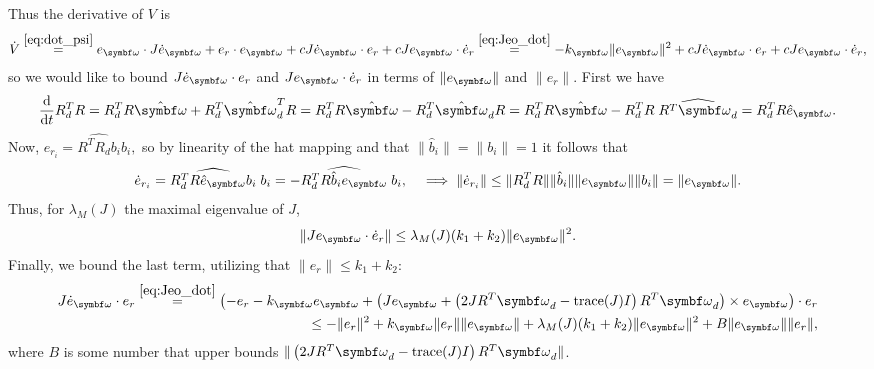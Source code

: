 Thus the derivative of $V$ is
\begin{equation}
  \begin{aligned}
    \dot V \overset{\eqref{eq:dot_psi}}= e_\bomega \cdot J \dot e_\bomega + e_r \cdot e_\bomega + c J \dot e_\bomega \cdot e_r + c J e_\bomega \cdot \dot e_r
    \overset{\eqref{eq:Jeo_dot}}= -k_\bomega \| e_\bomega \|^2 + c J \dot e_\bomega \cdot e_r + c J e_\bomega \cdot \dot e_r,
  \end{aligned}
\end{equation}
so we would like to bound $J \dot e_\bomega \cdot e_r$ and $J e_\bomega \cdot \dot e_r$ in terms of $\| e_\bomega \|$ and $\| e_r \|$.  First we have
\begin{equation}
  \label{eq:rdr_dt}
  \frac{\mathrm{d}}{\mathrm{d}t} R_d^T R = R_d^T R \hat \bomega + R_d^T \hat \bomega_d^T R  = R_d^T R \hat \bomega - R_d^T \hat \bomega_d R = R_d^T R \hat \bomega - R_d^T R \; \widehat{R^T \bomega_d} = R_d^T R \hat e_\bomega.
\end{equation}
Now, $e_{r_i} = \widehat{R^T R_d b_i} b_i,$ so by linearity of the hat mapping and that $\| \hat b_i \| = \| b_i \| = 1$ it follows that
\begin{equation}
  \dot e_{r_i} = \widehat{R_d^T R \hat e_\bomega b_i} \; b_i = - \widehat{R_d^T R \hat b_i e_\bomega} \; b_i, \quad \implies \| \dot e_{r_i} \| \leq \| R_d^T R \| \| \hat b_i \| \| e_\bomega \| \| b_i \| = \| e_\bomega \|.
\end{equation}
Thus, for $\lambda_M(J)$ the maximal eigenvalue of $J$,
\begin{equation}
  \| J e_\bomega \cdot \dot e_r \| \leq \lambda_M(J) (k_1 + k_2) \| e_\bomega \|^2.
\end{equation}
Finally, we bound the last term, utilizing that $\| e_r \| \leq k_1 + k_2$:
\begin{equation}
  \begin{aligned}
    J \dot e_\bomega \cdot  e_r  \overset{\eqref{eq:Jeo_dot}}= \left( -e_r - k_\bomega e_\bomega + \left( J e_\bomega + \left(2 J R^T \bomega_d - \text{trace}(J) I \right) R^T \bomega_d \right) \times e_\bomega \right) \cdot e_r \\
    \leq - \| e_r \|^2 + k_\bomega \| e_r \| \| e_\bomega \| + \lambda_M(J) (k_1 + k_2) \| e_\bomega \|^2 + B \| e_\bomega \| \| e_r \|,
  \end{aligned}
\end{equation}
where $B$ is some number that upper bounds $\| \left( 2 J R^T \bomega_d - \text{trace}(J) I \right) R^T \bomega_d \|$.

